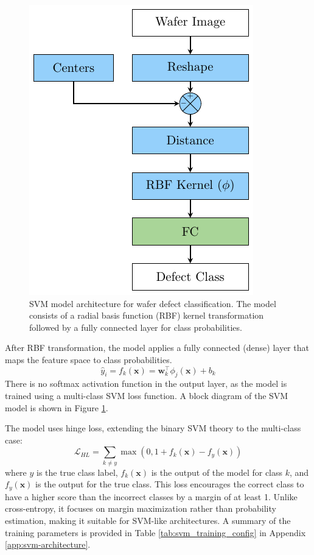 \documentclass[conference]{IEEEtran}
\begin{document}
\begin{figure}[b!]
    \centering
    \includegraphics[width=0.7\linewidth]{assets/svm-model.pdf}
    \caption{SVM model architecture for wafer defect classification. The model consists of a radial basis function (RBF) kernel transformation followed by a fully connected layer for class probabilities.}
    \label{fig:svm-model}
\end{figure}

After RBF transformation, the model applies a fully connected (dense) layer that maps the feature space to class probabilities.
\begin{equation}
    \hat{y}_i = f_k(\bm{x}) = \bm{w}^\top_k \phi_j(\bm{x}) + b_k
\end{equation}
There is no softmax activation function in the output layer, as the model is trained using a multi-class SVM loss function.
A block diagram of the SVM model is shown in Figure \ref{fig:svm-model}.

The model uses hinge loss, extending the binary SVM theory to the multi-class case:
\begin{equation}
    \mathcal{L}_{HL} = \sum_{k\neq y} \max(0, 1 + f_k(\bm{x}) - f_{y}(\bm{x}))
\end{equation}
where \(y\) is the true class label, \(f_k(\bm{x})\) is the output of the model for class \(k\), and \(f_{y}(\bm{x})\) is the output for the true class.
This loss encourages the correct class to have a higher score than the incorrect classes by a margin of at least 1.
Unlike cross-entropy, it focuses on margin maximization rather than probability estimation, making it suitable for SVM-like architectures.
A summary of the training parameters is provided in Table \ref{tab:svm_training_config} in Appendix \ref{app:svm-architecture}.
\end{document}

